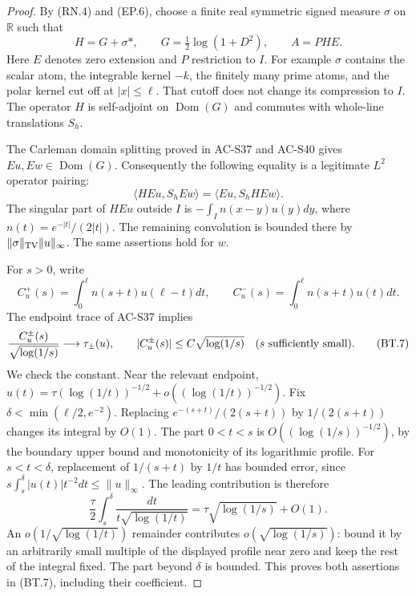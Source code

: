 \begin{proof}
By (RN.4) and (EP.6), choose a finite real symmetric signed
measure \(\sigma\) on \(\mathbb R\) such that
\[
 H=G+\sigma*,\qquad
 G=\tfrac12\log(1+D^2),\qquad A=PH E.                   \tag{BT.4}
\]
Here \(E\) denotes zero extension and \(P\) restriction to \(I\).
For example \(\sigma\) contains the scalar atom,
the integrable kernel \(-k\), the finitely many prime atoms,
and the polar kernel cut off at \(|x|\leq\ell\).
That cutoff does not change its compression to \(I\).
The operator \(H\) is self-adjoint on \(\operatorname{Dom}(G)\)
and commutes with whole-line translations \(S_h\).

The Carleman domain splitting proved in AC-S37 and AC-S40 gives
\(Eu,Ew\in\operatorname{Dom}(G)\).
Consequently the following equality is a legitimate \(L^2\)
operator pairing:
\[
                   \langle HEu,S_hEw\rangle
                        =\langle Eu,S_hHEw\rangle.        \tag{BT.5}
\]
The singular part of \(HEu\) outside \(I\) is
\(-\int_I n(x-y)u(y)dy\), where
\(n(t)=e^{-|t|}/(2|t|)\).
The remaining convolution is bounded there by
\(\|\sigma\|_{\rm TV}\|u\|_\infty\).
The same assertions hold for \(w\).

For \(s>0\), write
\[
 C_u^+(s)=\int_0^\ell n(s+t)u(\ell-t)dt,
 \qquad
 C_u^-(s)=\int_0^\ell n(s+t)u(t)dt.
                                                        \tag{BT.6}
\]
The endpoint trace of AC-S37 implies
\[
 \frac{C_u^\pm(s)}{\sqrt{\log(1/s)}}\longrightarrow\tau_\pm(u),
 \qquad |C_u^\pm(s)|\leq C\sqrt{\log(1/s)}
                              \quad(s\hbox{ sufficiently small}).
                                                        \tag{BT.7}
\]
We check the constant.  Near the relevant endpoint,
\(u(t)=\tau(\log(1/t))^{-1/2}
       +o((\log(1/t))^{-1/2})\).
Fix \(\delta<\min(\ell/2,e^{-2})\).
Replacing \(e^{-(s+t)}/(2(s+t))\) by \(1/(2(s+t))\)
changes its integral by \(O(1)\).
The part \(0<t<s\) is \(O((\log(1/s))^{-1/2})\), by
the boundary upper bound and monotonicity of its logarithmic profile.
For \(s<t<\delta\), replacement of \(1/(s+t)\) by \(1/t\)
has bounded error, since
\(s\int_s^\delta |u(t)|t^{-2}dt\leq\|u\|_\infty\).
The leading contribution is therefore
\[
 \frac{\tau}{2}\int_s^\delta
                     \frac{dt}{t\sqrt{\log(1/t)}}
                           =\tau\sqrt{\log(1/s)}+O(1).
                                                        \tag{BT.8}
\]
An \(o(1/\sqrt{\log(1/t)})\) remainder contributes
\(o(\sqrt{\log(1/s)})\): bound it by an arbitrarily small
multiple of the displayed profile near zero and keep the rest
of the integral fixed.  The part beyond \(\delta\) is bounded.
This proves both assertions in (BT.7), including their coefficient.


\end{proof}
